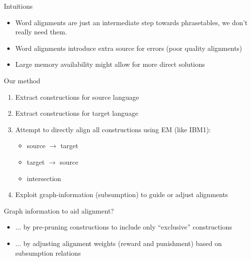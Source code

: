 \documentclass[compress]{beamer}
\begin{document}
\begin{frame}
	\begin{block}{Intuitions}
		\begin{itemize}
			\footnotesize
			\item Word alignments are just an intermediate step towards phrasetables, we don't really need them.
			\item Word alignments introduce extra source for errors (poor quality alignments)
			\item Large memory availability might allow for more direct solutions
		\end{itemize}
	\end{block}
	\begin{block}{Our method}
		\begin{enumerate}
			\item Extract constructions for source language  
			\item Extract constructions for target language
			\item Attempt to directly align all constructions using EM (like IBM1):
			\begin{itemize}
				\item source $\rightarrow$ target
				\item target $\rightarrow$ source
				\item intersection
			\end{itemize}
			\item {\footnotesize Exploit graph-information (subsumption) to guide or adjust alignments}
		\end{enumerate}	
	\end{block}
\end{frame}

\begin{frame}
	\begin{block}{Graph information to aid alignment?}
		\begin{itemize}
			\item ... by pre-pruning constructions to include only ``exclusive'' constructions			
			\item ... by adjusting alignment weights (reward and punishment) based on subsumption relations
		\end{itemize}
		
	\end{block}
\end{frame}
\end{document}
